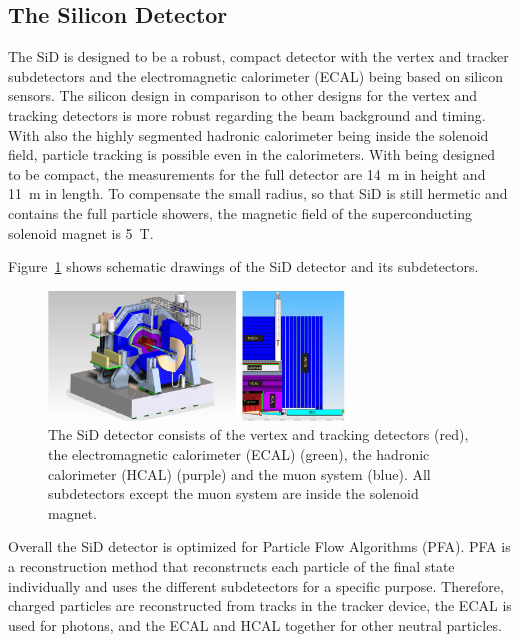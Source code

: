 \subsection{The Silicon Detector}
The SiD is designed to be a robust, compact detector with the vertex and tracker subdetectors and the electromagnetic calorimeter (ECAL) being based on silicon sensors.
The silicon design in comparison to other designs for the vertex and tracking detectors is more robust regarding the beam background and timing.
With also the highly segmented hadronic calorimeter being inside the solenoid field, particle tracking is possible even in the calorimeters.
With being designed to be compact, the measurements for the full detector are \SI{14}{m} in height and \SI{11}{m} in length.
To compensate the small radius, so that SiD is still hermetic and contains the full particle showers, the magnetic field of the superconducting solenoid magnet is \SI{5}{T}.

Figure~\ref{fig:SiD} shows schematic drawings of the SiD detector and its subdetectors.

\begin{figure}
\centering
\includegraphics[width=0.7\textwidth]{Figures/SiD.png}
\caption[Schematic drawing of the SiD detector]{The SiD detector consists of the vertex and tracking detectors (red), the electromagnetic calorimeter (ECAL) (green), the hadronic calorimeter (HCAL) (purple) and the muon system (blue). All subdetectors except the muon system are inside the solenoid magnet.\cite[p. 31]{TDR1}}
\label{fig:SiD}
\end{figure}

Overall the SiD detector is optimized for Particle Flow Algorithms (PFA).
PFA is a reconstruction method that reconstructs each particle of the final state individually and uses the different subdetectors for a specific purpose.
Therefore, charged particles are reconstructed from tracks in the tracker device, the ECAL is used for photons, and the ECAL and HCAL together for other neutral particles. 


